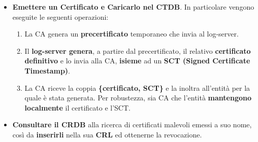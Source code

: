 \begin{proposition}
\begin{itemize}
    \item \textbf{Emettere un Certificato e Caricarlo nel CTDB}. In particolare vengono eseguite le seguenti operazioni:
    \begin{enumerate}
        \item La CA genera un \textbf{precertificato} temporaneo che invia al log-server.
        \item Il \textbf{log-server genera}, a partire dal precertificato, il relativo \textbf{certificato definitivo} e lo invia alla CA, \textbf{isieme} ad un \textbf{SCT (Signed Certificate Timestamp)}\footnotemark.
        \item La CA riceve la coppia \textbf{\{certificato, SCT\}} e la inoltra all'entità per la quale è stata generata. Per robustezza, sia CA che l'entità \textbf{mantengono localmente} il certificato e l'SCT.
    \end{enumerate}
    \item \textbf{Consultare il CRDB\footnotemark} alla ricerca di certificati malevoli emessi a suo nome, così da \textbf{inserirli} nella sua \textbf{CRL} ed ottenerne la revocazione.
\end{itemize}
\end{proposition}

